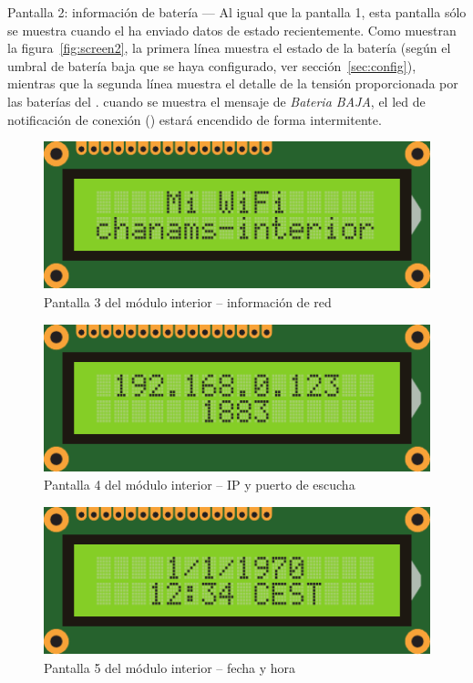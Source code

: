 \begin{descriptioncompact}
\item[Pantalla 2: información de batería] --- Al igual que la pantalla 1, esta pantalla sólo se muestra cuando el \MEE ha enviado datos de estado recientemente. Como muestran la figura~\ref{fig:screen2}, la primera línea muestra el estado de la batería (según el umbral de batería baja que se haya configurado, ver sección~\ref{sec:config}), mientras que la segunda línea muestra el detalle de la tensión proporcionada por las baterías del \MEE. cuando se muestra el mensaje de \emph{Bateria BAJA}, el led de notificación de conexión  () estará encendido de forma intermitente.

\begin{figure}
  \centering
  \includegraphics[width=0.6\columnwidth]{images/screen3}
  \caption{Pantalla 3 del módulo interior -- información de red}
  \label{fig:screen3}
\end{figure}

\begin{figure}
  \centering
  \includegraphics[width=0.6\columnwidth]{images/screen4}
  \caption{Pantalla 4 del módulo interior -- IP y puerto de escucha}
  \label{fig:screen4}
\end{figure}

\begin{figure}[!b]
  \centering
  \includegraphics[width=0.6\columnwidth]{images/screen5}
  \caption{Pantalla 5 del módulo interior -- fecha y hora}
  \label{fig:screen5}
\end{figure}


\end{descriptioncompact}
